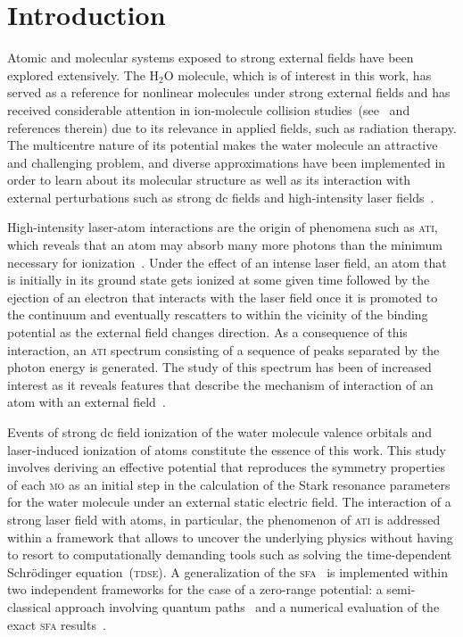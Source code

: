 \chapter{Introduction}
\label{cha:introduction}



Atomic and molecular systems exposed to strong external fields have
been explored extensively. The H$_{2}$O molecule, which is of interest
in this work, has served as a reference for nonlinear molecules under
strong external fields and has received considerable attention in
ion-molecule collision
studies~(see~\cite{horbatsch_2012col,illescas_2013} and references
therein) due to its relevance in applied fields, such as radiation
therapy.  The multicentre nature of its potential makes the water
molecule an attractive and challenging problem, and diverse
approximations have been implemented in order to learn about its
molecular structure as well as its interaction with external
perturbations such as strong dc fields and high-intensity laser
fields~\cite{Jagau_manybody_H2O,Toru_weakF_H2O,Krause2015_CAP_H2O,Zhao_2011_H2Otunneling,Petretti_H2O_laser}.

High-intensity laser-atom interactions are the origin of phenomena
such as \textsc{ati}, which reveals that an atom may absorb many more
photons than the minimum necessary for ionization~\cite{ATI1979}.
Under the effect of an intense laser field, an atom that is initially
in its ground state gets ionized at some given time followed by the
ejection of an electron that interacts with the laser field once it is
promoted to the continuum and eventually rescatters to within the
vicinity of the binding potential as the external field changes
direction. As a consequence of this interaction, an \textsc{ati}
spectrum consisting of a sequence of peaks separated by the photon
energy is generated. The study of this spectrum has been of increased
interest as it reveals features that describe the mechanism of
interaction of an atom with an external
field~\cite{BeckerRescattering_2018,Becker_ati2002}.

Events of strong dc field ionization of the water molecule valence
orbitals and laser-induced ionization of atoms constitute the essence
of this work. This study involves deriving an effective potential that
reproduces the symmetry properties of each \textsc{mo} as an initial
step in the calculation of the Stark resonance parameters for the
water molecule under an external static electric field.
The interaction of a strong laser field with atoms, in particular, the
phenomenon of \textsc{ati} is addressed within a framework that allows
to uncover the underlying physics without having to resort to
computationally demanding tools such as solving the time-dependent
Schr\"{o}dinger equation~(\textsc{tdse}). A generalization of the
\textsc{sfa}~\cite{KeldyshSFA} is implemented within two independent
frameworks for the case of a zero-range potential: a semi-classical
approach involving quantum paths~\cite{KopoldOptComm2000} and a
numerical evaluation of the exact \textsc{sfa}
results~\cite{Kopold_1997sfa}.

